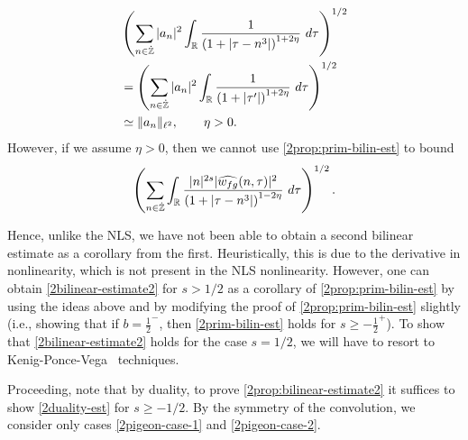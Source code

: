 \begin{equation*}
	\begin{split}
		& \left( \sum_{n \in \zzdot} | a_{n} |^2\int_{\rr} \frac{1}{\left( 1 + | \tau -
		n^3 | \right)^{1 + 2 \eta}} \ d \tau  
		\right)^{1/2} 
		\\
		& = \left ( \sum_{n \in \zzdot}
		| a_n |^2 
		\int_{\rr} \frac{1}{\left( 1 + | \tau' | \right)^{1 + 2 \eta}} \ d 
		\tau \right)^{1/2}
		\\
		& \simeq \|a_n\|_{\ell^2}, \qquad \eta >0.
		\end{split}
\end{equation*}
However, if we assume $\eta >0$, then
we cannot use \cref{2prop:prim-bilin-est} to bound
\begin{equation*}
	\begin{split}
		\left ( \sum_{n \in \dot{\mathbb{Z}}}\int_{\mathbb{R}} \frac{|n|^{2s} | \widehat{w_{fg}}(n, \tau) 
		|^2}{\left( 1 + | \tau - n^3 | \right)^{1 - 2\eta}}\ d \tau
		\right)^{1/2}. 
	\end{split}
\end{equation*}
\begin{remark}
Hence, unlike the NLS, we have not been able to obtain a second bilinear
estimate as a corollary from the first. Heuristically, this is due to the
derivative in nonlinearity, which is not present in the NLS nonlinearity.
However, one can obtain \eqref{2bilinear-estimate2} for $s>1/2$ as a
corollary of \cref{2prop:prim-bilin-est} by using the ideas
above and by modifying the proof of \cref{2prop:prim-bilin-est} slightly (i.e.,
showing that if $b = \frac{1}{2}^-$, then \eqref{2prim-bilin-est} holds for
$s\ge-\frac{1}{2}^+$). To show that \eqref{2bilinear-estimate2} holds for the
case $s=1/2$, we will have to resort to Kenig-Ponce-Vega~\cite{Kenig:1996yn} techniques.
\end{remark}
%
%
Proceeding, note that by duality, to prove \cref{2prop:bilinear-estimate2} it
suffices to show \eqref{2duality-est} for $s \ge -1/2$. By the symmetry of the convolution, we
consider only cases \eqref{2pigeon-case-1} and \eqref{2pigeon-case-2}.
%
%

